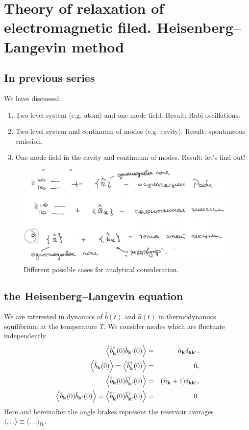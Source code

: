 \section{Theory of relaxation of electromagnetic filed. Heisenberg--Langevin method}

\subsection{In previous series}

We have discussed:
\begin{enumerate}
	\item Two-level system (e.g. atom) and one mode field. Result: Rabi oscillations.
	\item Two-level system and continuum of modes (e.g. cavity). Result: spontaneous emission.
	\item One-mode field in the cavity and continuum of modes. Result: let's find out!
\end{enumerate}

\begin{figure}[h!]
	\centering
	\includegraphics[width=0.8\linewidth]{fig/L9/fig1}
	\caption{Different possible cases for analytical consideration.}
	\label{fig:fig11}
\end{figure}

\subsection{the Heisenberg--Langevin equation}

We are interested in dynamics of $\hat{b}(t)$ and $\hat{a}(t)$ in thermodynamics equilibrium at the temperature $T$. We consider modes which are fluctuate independently
\begin{eqnarray}
	\left \langle \hat{b}^{\dagger}_{\mathbf{k}} (0) \hat{b}_{\mathbf{k}'} (0) \right \rangle &=& \bar{n}_{\mathbf{k}} \delta_{\mathbf{k}\mathbf{k}'}, \\
	\left\langle {\hat{b}_{\mathbf{k}}(0)} \right\rangle = \left\langle {\hat{b}^{\dagger}_{\mathbf{k}}(0)} \right\rangle &=& 0,\\
	\left\langle {\hat{b}_{\mathbf{k}} (0) \hat{b}^{\dagger}_{\mathbf{k}'} (0) } \right\rangle &=& (\bar{n}_{\mathbf{k}}+1) \delta_{\mathbf{k}\mathbf{k}'}, \\
	\left\langle {\hat{b}_{\mathbf{k}} (0) \hat{b}_{\mathbf{k}'} (0) } \right\rangle = \left\langle {\hat{b}^{\dagger}_{\mathbf{k}} (0) \hat{b}^{\dagger}_{\mathbf{k}'} (0) } \right\rangle &=& 0.
\end{eqnarray}
Here and  hereinafter the angle brakes represent the reservoir averages $\left\langle {\dots} \right\rangle \equiv \left\langle {\dots} \right\rangle_{\text{R}}$.

